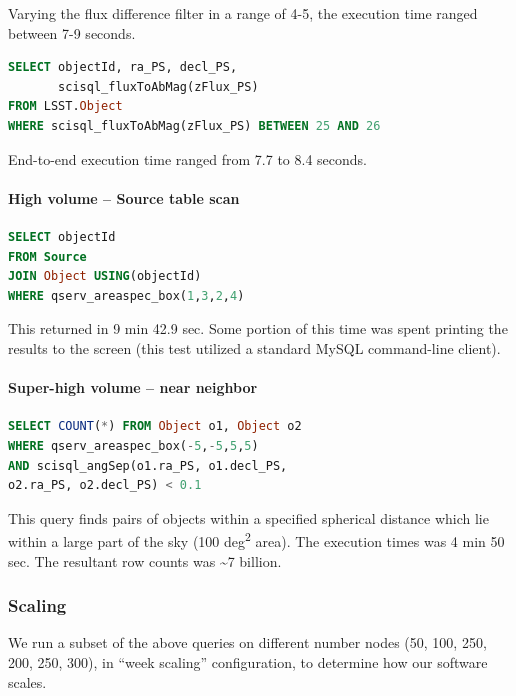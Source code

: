 \documentclass[DM,lsstdraft,toc]{lsstdoc}
\begin{document}
Varying the flux difference filter in a range of 4-5, the execution time
ranged between 7-9 seconds.

\begin{lstlisting}[language=SQL]
SELECT objectId, ra_PS, decl_PS,
       scisql_fluxToAbMag(zFlux_PS)
FROM LSST.Object
WHERE scisql_fluxToAbMag(zFlux_PS) BETWEEN 25 AND 26
\end{lstlisting}

End-to-end execution time ranged from 7.7 to 8.4 seconds.

\paragraph{High volume -- Source table
scan}\label{high-volume-source-table-scan}

\begin{lstlisting}[language=SQL]
SELECT objectId
FROM Source
JOIN Object USING(objectId)
WHERE qserv_areaspec_box(1,3,2,4)
\end{lstlisting}

This returned in 9 min 42.9 sec. Some portion of this time was spent
printing the results to the screen (this test utilized a standard MySQL
command-line client).

\paragraph{Super-high volume -- near
neighbor}\label{super-high-volume-near-neighbor}

\begin{lstlisting}[language=SQL]
SELECT COUNT(*) FROM Object o1, Object o2
WHERE qserv_areaspec_box(-5,-5,5,5)
AND scisql_angSep(o1.ra_PS, o1.decl_PS,
o2.ra_PS, o2.decl_PS) < 0.1
\end{lstlisting}

This query finds pairs of objects within a specified spherical distance
which lie within a large part of the sky (100 deg\textsuperscript{2}
area). The execution times was 4 min 50 sec. The resultant row counts
was \textasciitilde{}7 billion.

\subsubsection{Scaling}\label{scaling-1}

We run a subset of the above queries on different number nodes (50, 100,
250, 200, 250, 300), in ``week scaling'' configuration, to determine how
our software scales.
\end{document}
